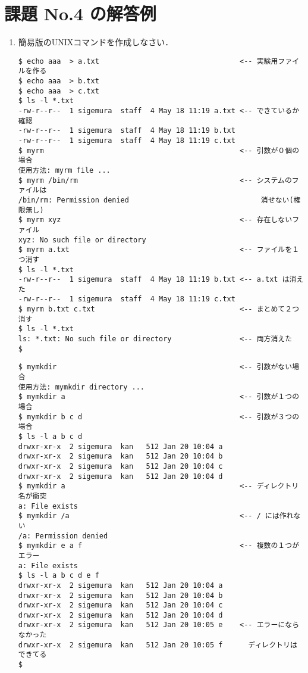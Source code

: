 \documentclass[a4j,twcolumn,11pt,nomag]{ltjarticle}      %
\begin{document}
\onecolumn

\section*{課題 No.4 の解答例}
\begin{enumerate}
\item 簡易版のUNIXコマンドを作成しなさい．
\begin{lstlisting}[caption=myrmの実行例（動作テスト！！）]
$ echo aaa  > a.txt                                 <-- 実験用ファイルを作る
$ echo aaa  > b.txt
$ echo aaa  > c.txt
$ ls -l *.txt
-rw-r--r--  1 sigemura  staff  4 May 18 11:19 a.txt <-- できているか確認
-rw-r--r--  1 sigemura  staff  4 May 18 11:19 b.txt
-rw-r--r--  1 sigemura  staff  4 May 18 11:19 c.txt
$ myrm                                              <-- 引数が０個の場合
使用方法: myrm file ...
$ myrm /bin/rm                                      <-- システムのファイルは
/bin/rm: Permission denied                               消せない(権限無し)
$ myrm xyz                                          <-- 存在しないファイル
xyz: No such file or directory
$ myrm a.txt                                        <-- ファイルを１つ消す
$ ls -l *.txt
-rw-r--r--  1 sigemura  staff  4 May 18 11:19 b.txt <-- a.txt は消えた
-rw-r--r--  1 sigemura  staff  4 May 18 11:19 c.txt
$ myrm b.txt c.txt                                  <-- まとめて２つ消す
$ ls -l *.txt
ls: *.txt: No such file or directory                <-- 両方消えた
$ 
\end{lstlisting}

\begin{lstlisting}[caption=mymkdirの実行例（動作テスト！！）]
$ mymkdir                                           <-- 引数がない場合
使用方法: mymkdir directory ...
$ mymkdir a                                         <-- 引数が１つの場合
$ mymkdir b c d                                     <-- 引数が３つの場合
$ ls -l a b c d
drwxr-xr-x  2 sigemura  kan   512 Jan 20 10:04 a
drwxr-xr-x  2 sigemura  kan   512 Jan 20 10:04 b
drwxr-xr-x  2 sigemura  kan   512 Jan 20 10:04 c
drwxr-xr-x  2 sigemura  kan   512 Jan 20 10:04 d
$ mymkdir a                                         <-- ディレクトリ名が衝突
a: File exists
$ mymkdir /a                                        <-- / には作れない
/a: Permission denied
$ mymkdir e a f                                     <-- 複数の１つがエラー
a: File exists
$ ls -l a b c d e f
drwxr-xr-x  2 sigemura  kan   512 Jan 20 10:04 a
drwxr-xr-x  2 sigemura  kan   512 Jan 20 10:04 b
drwxr-xr-x  2 sigemura  kan   512 Jan 20 10:04 c
drwxr-xr-x  2 sigemura  kan   512 Jan 20 10:04 d
drwxr-xr-x  2 sigemura  kan   512 Jan 20 10:05 e    <-- エラーにならなかった
drwxr-xr-x  2 sigemura  kan   512 Jan 20 10:05 f      ディレクトリはできてる
$
\end{lstlisting}


\end{enumerate}
\end{document}
